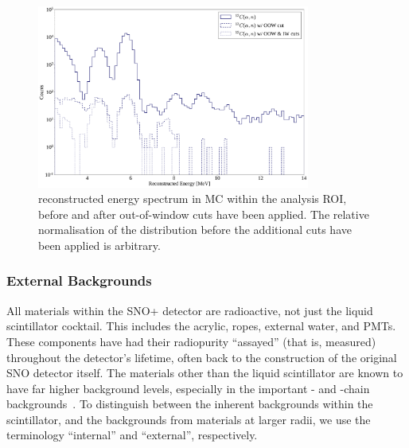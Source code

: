 \begin{figure}
    \centering
    \includegraphics[width=0.8\textwidth]{6_SolarAnalysis/images/alphan_tagging_eff.pdf}
    \caption[\alphan{} reconstructed energy spectrum in MC within the analysis ROI, before and after out-of-window cuts have been applied]
    {\alphan{} reconstructed energy spectrum in MC within the analysis ROI, before and after out-of-window cuts have been applied. The relative normalisation of the distribution before the additional cuts have been applied is arbitrary.}
    \label{fig:alpha_n_coincidence_cut_impact}
\end{figure}


\subsubsection{External Backgrounds}
All materials within the SNO+ detector are radioactive, not just the liquid scintillator cocktail. This includes the acrylic, ropes, external water, and PMTs. These components have had their radiopurity ``assayed'' (that is, measured) throughout the detector's lifetime, often back to the construction of the original SNO detector itself. The materials other than the liquid scintillator are known to have far higher background levels, especially in the important - and -chain backgrounds~\cite{andringaCurrentStatusFuture2016}. %
To distinguish between the inherent backgrounds within the scintillator, and the backgrounds from materials at larger radii, we use the terminology ``internal'' and ``external'', respectively.

